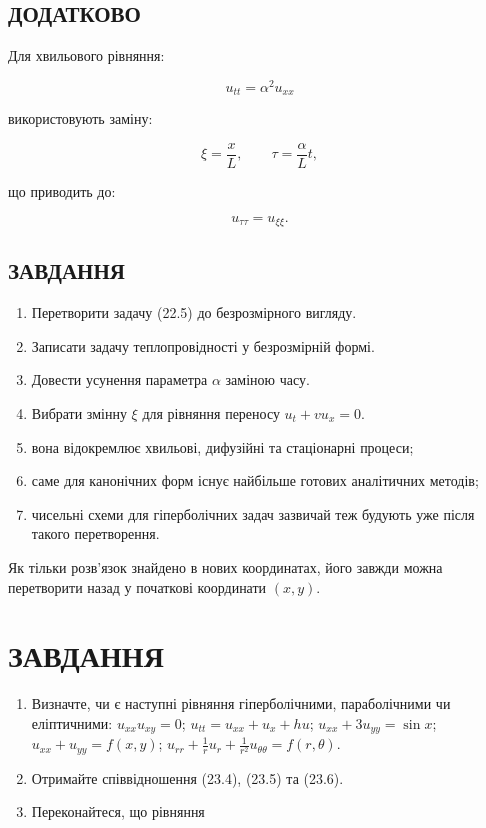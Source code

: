 \documentclass[
  ukrainian,
]{article}
\providecommand{\tightlist}{%
  \setlength{\itemsep}{0pt}\setlength{\parskip}{0pt}}
\begin{document}
\subsection{ДОДАТКОВО}\label{ux434ux43eux434ux430ux442ux43aux43eux432ux43e}

Для хвильового рівняння:

\[
u_{tt} = \alpha^2 u_{xx}
\]

використовують заміну:

\[
\xi = \frac{x}{L}, \qquad \tau = \frac{\alpha}{L} t,
\]

що приводить до:

\[
u_{\tau\tau} = u_{\xi\xi}.
\]

\subsection{ЗАВДАННЯ}\label{ux437ux430ux432ux434ux430ux43dux43dux44f-14}

\begin{enumerate}
\def\labelenumi{\arabic{enumi}.}
\tightlist
\item
  Перетворити задачу (22.5) до безрозмірного вигляду.
\item
  Записати задачу теплопровідності у безрозмірній формі.
\item
  Довести усунення параметра \(\alpha\) заміною часу.
\item
  Вибрати змінну \(\xi\) для рівняння переносу \(u_t + v u_x = 0\).
\item
  вона відокремлює хвильові, дифузійні та стаціонарні процеси;
\item
  саме для канонічних форм існує найбільше готових аналітичних методів;
\item
  чисельні схеми для гіперболічних задач зазвичай теж будують уже після
  такого перетворення.
\end{enumerate}

Як тільки розв'язок знайдено в нових координатах, його завжди можна
перетворити назад у початкові координати \((x,y)\).

\section{ЗАВДАННЯ}\label{ux437ux430ux432ux434ux430ux43dux43dux44f-15}

\begin{enumerate}
\def\labelenumi{\arabic{enumi}.}
\item
  Визначте, чи є наступні рівняння гіперболічними, параболічними чи
  еліптичними: \(u_{xx}u_{xy}=0\); \(u_{tt}=u_{xx}+u_x+hu\);
  \(u_{xx}+3u_{yy}=\sin x\); \(u_{xx}+u_{yy}=f(x,y)\);
  \(u_{rr}+\frac{1}{r}u_r+\frac{1}{r^2}u_{\theta\theta}=f(r,\theta)\).
\item
  Отримайте співвідношення (23.4), (23.5) та (23.6).
\item
  Переконайтеся, що рівняння
\end{enumerate}
\end{document}
